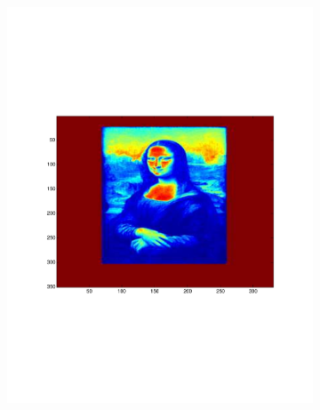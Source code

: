 \begin{figure}[h!tbp]
    \centering
    \begin{subfigure}[a]{0.3\textwidth}
        \includegraphics[width=\textwidth]{img/p5_mona.pdf}
    \end{subfigure}
    \begin{subfigure}[a]{0.3\textwidth}

\end{subfigure}
\end{figure}
